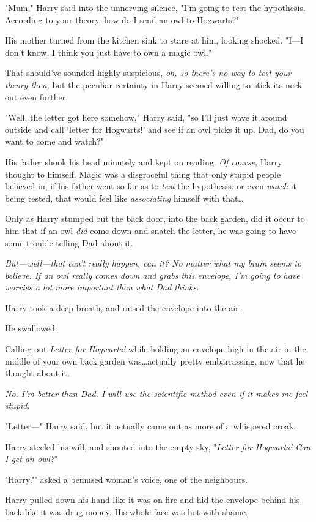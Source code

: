"Mum," Harry said into the unnerving silence, "I'm going to test the
hypothesis. According to your theory, how do I send an owl to Hogwarts?"

His mother turned from the kitchen sink to stare at him, looking shocked.
"I—I don't know, I think you just have to own a magic owl."

That should've sounded highly suspicious, \emph{oh, so there's no way to test
your theory then,} but the peculiar certainty in Harry seemed willing to stick
its neck out even further.

"Well, the letter got here somehow," Harry said, "so I'll just wave it around
outside and call `letter for Hogwarts!' and see if an owl picks it up. Dad, do
you want to come and watch?"

His father shook his head minutely and kept on reading. \emph{Of course,} Harry
thought to himself. Magic was a disgraceful thing that only stupid people
believed in; if his father went so far as to \emph{test} the hypothesis, or
even \emph{watch} it being tested, that would feel like \emph{associating}
himself with that…

Only as Harry stumped out the back door, into the back garden, did it occur to
him that if an owl \emph{did} come down and snatch the letter, he was going to
have some trouble telling Dad about it.

\emph{But—well—that can't \emph{really} happen, can it? No matter what my
brain seems to believe. If an owl really comes down and grabs this envelope,
I'm going to have worries a lot more important than what Dad thinks.}

Harry took a deep breath, and raised the envelope into the air.

He swallowed.

Calling out \emph{Letter for Hogwarts!} while holding an envelope high in the
air in the middle of your own back garden was…actually pretty
embarrassing, now that he thought about it.

\emph{No. I'm better than Dad. I will use the scientific method even if it
makes me feel stupid.}

"Letter—" Harry said, but it actually came out as more of a whispered croak.

Harry steeled his will, and shouted into the empty sky, "\emph{Letter for
Hogwarts! Can I get an owl?}"

"Harry?" asked a bemused woman's voice, one of the neighbours.

Harry pulled down his hand like it was on fire and hid the envelope behind his
back like it was drug money. His whole face was hot with shame.

